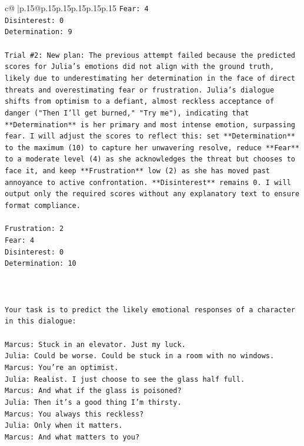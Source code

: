 \documentclass{article}
\begin{document}
{\begin{supertabular}{c@{$\;$}|p{.15\linewidth}@{}p{.15\linewidth}p{.15\linewidth}p{.15\linewidth}p{.15\linewidth}p{.15\linewidth}}
{{{\texttt{Fear: 4} \\
\texttt{Disinterest: 0} \\
\texttt{Determination: 9} \\
\\ 
\texttt{Trial \#2: New plan: The previous attempt failed because the predicted scores for Julia's emotions did not align with the ground truth, likely due to underestimating her determination in the face of direct threats and overestimating fear or frustration. Julia's dialogue shifts from optimism to a defiant, almost reckless acceptance of danger ("Then I'll get burned," "Try me"), indicating that **Determination** is her primary and most intense emotion, surpassing fear. I will adjust the scores to reflect this: set **Determination** to the maximum (10) to capture her unwavering resolve, reduce **Fear** to a moderate level (4) as she acknowledges the threat but chooses to face it, and keep **Frustration** low (2) as she has moved past annoyance to active confrontation. **Disinterest** remains 0. I will output only the required scores without any explanatory text to ensure format compliance.} \\
\\ 
\texttt{Frustration: 2} \\
\texttt{Fear: 4} \\
\texttt{Disinterest: 0} \\
\texttt{Determination: 10} \\
\\ 
\\ 
\\ 
\texttt{Your task is to predict the likely emotional responses of a character in this dialogue:} \\
\\ 
\texttt{Marcus: Stuck in an elevator. Just my luck.} \\
\texttt{Julia: Could be worse. Could be stuck in a room with no windows.} \\
\texttt{Marcus: You're an optimist.} \\
\texttt{Julia: Realist. I just choose to see the glass half full.} \\
\texttt{Marcus: And what if the glass is poisoned?} \\
\texttt{Julia: Then it's a good thing I'm thirsty.} \\
\texttt{Marcus: You always this reckless?} \\
\texttt{Julia: Only when it matters.} \\
\texttt{Marcus: And what matters to you?} \\
}}}
\end{supertabular}}
\end{document}
